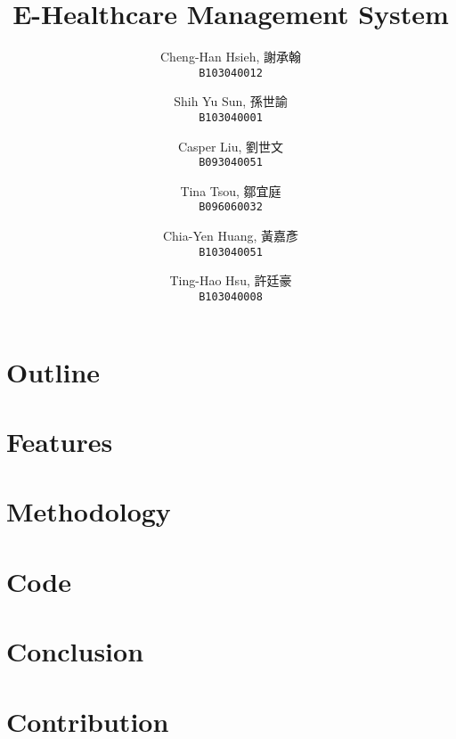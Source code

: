 \documentclass{article}
\begin{document}
\title{E-Healthcare Management System}
\author{
  Cheng-Han Hsieh, 謝承翰\\
  \texttt{B103040012}
  \and
  Shih Yu Sun, 孫世諭\\
  \texttt{B103040001}
  \and
  Casper Liu, 劉世文\\
  \texttt{B093040051}
  \and
  Tina Tsou, 鄒宜庭\\
  \texttt{B096060032}
  \and
  Chia-Yen Huang, 黃嘉彥\\
  \texttt{B103040051}
  \and
  Ting-Hao Hsu, 許廷豪\\
  \texttt{B103040008}
}

\maketitle

\section{Outline}
\label{sec:outline}

\section{Features}
\label{sec:features}

\section{Methodology}
\label{sec:methodology}

\section{Code}
\label{sec:code}

\section{Conclusion}
\label{sec:conclusion}

\section{Contribution}
\label{sec:contribution}
\end{document}

